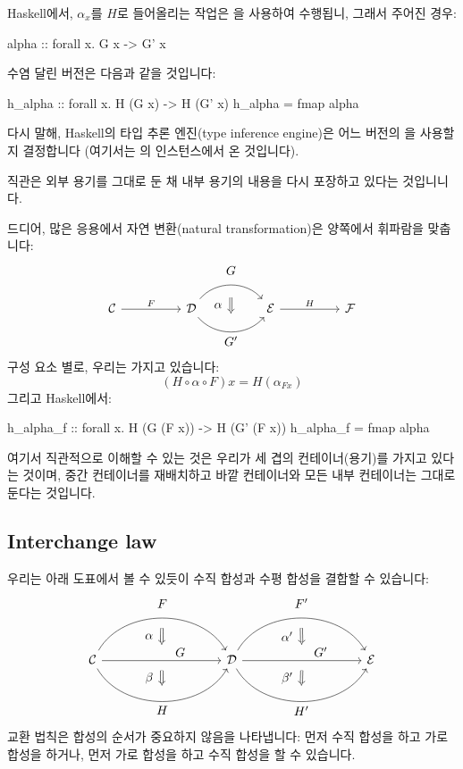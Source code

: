 \documentclass[DaoFP]{subfiles}
\begin{document}
Haskell에서, $\alpha_x$를 $H$로 들어올리는 작업은 을 사용하여 수행됩니, 그래서 주어진 경우:
\begin{haskell}
alpha :: forall x. G x -> G' x
\end{haskell}
수염 달린 버전은 다음과 같을 것입니다:
\begin{haskell}
h_alpha :: forall x. H (G x) -> H (G' x)
h_alpha = fmap alpha
\end{haskell}
다시 말해, Haskell의 타입 추론 엔진(type inference engine)은 어느 버전의 을 사용할지 결정합니다 (여기서는 의  인스턴스에서 온 것입니다).

직관은 외부 용기를 그대로 둔 채 내부 용기의 내용을 다시 포장하고 있다는 것입니니다.

드디어, 많은 응용에서 자연 변환(natural transformation)은 양쪽에서 휘파람을 맞춥니다:
\[
\begin{tikzcd}[column sep=huge]
\mathcal{C}
 \arrow[r, "F"]
 &
\mathcal{D}
  \arrow[bend left=50]{r}[name=U1, label=above:$G$]{}
  \arrow[bend right=50]{r}[name=D1, label=below:$G'$]{} 
 &
\mathcal{E}
  \arrow[shorten <=10pt,shorten >=10pt,Rightarrow,to path={(U1) -- node[label=left:$\alpha$] {} (D1)}]{}
  \arrow[r, "H"]
 &
 \mathcal{F}
\end{tikzcd}
\]
구성 요소 별로, 우리는 가지고 있습니다:
\[ (H \circ \alpha \circ F) x = H (\alpha_{F x})\]
그리고 Haskell에서:
\begin{haskell}
h_alpha_f :: forall x. H (G (F x)) -> H (G' (F x))
h_alpha_f = fmap alpha
\end{haskell}

여기서 직관적으로 이해할 수 있는 것은 우리가 세 겹의 컨테이너(용기)를 가지고 있다는 것이며, 중간 컨테이너를 재배치하고 바깥 컨테이너와 모든 내부 컨테이너는 그대로 둔다는 것입니다.

\subsection{Interchange law}

우리는 아래 도표에서 볼 수 있듯이 수직 합성과 수평 합성을 결합할 수 있습니다:
\[
\begin{tikzcd}[column sep=huge]
\mathcal{C}
  \arrow[bend left=60]{rr}[name=U, label=above:$F$]{}
  \arrow[]{rr}[name=M, label={[xshift=15pt, yshift=-5pt]:$G$}]{} 
  \arrow[bend right=60]{rr}[name=D, label=below:$H$]{} 
 &&
\mathcal{D}
  \arrow[bend left=60]{rr}[name=U1, label=above:$F'$]{}
  \arrow[]{rr}[name=M1, label={[xshift=15pt, yshift=-5pt]:$G'$}]{} 
  \arrow[bend right=60]{rr}[name=D1, label=below:$H'$]{} 
&&
\mathcal{E}
  \arrow[shorten <=8pt, shorten >=8pt,Rightarrow, to path={(U) -- node[label=left:$\alpha$] {} (M)}]{}
  \arrow[shorten <=8pt, shorten >=8pt,Rightarrow, to path={(M) -- node[label=left:$\beta$] {} (D)}]{}
  \arrow[shorten <=8pt, shorten >=8pt,Rightarrow, to path={(U1) -- node[label=left:$\alpha'$] {} (M1)}]{}
  \arrow[shorten <=8pt, shorten >=8pt,Rightarrow, to path={(M1) -- node[label=left:$\beta'$] {} (D1)}]{}
\end{tikzcd}
\]
교환 법칙은 합성의 순서가 중요하지 않음을 나타냅니다: 먼저 수직 합성을 하고 가로 합성을 하거나, 먼저 가로 합성을 하고 수직 합성을 할 수 있습니다.
\end{document}
